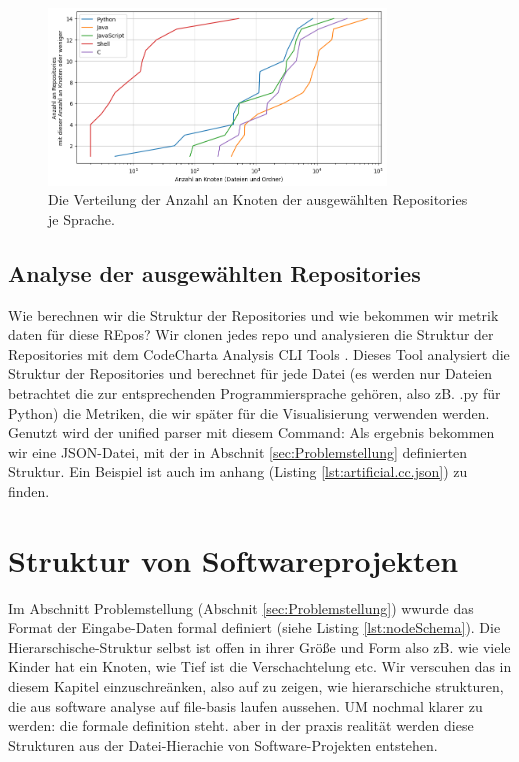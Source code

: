 \begin{figure}
    \centering
    \includegraphics[width=0.8\textwidth]{images/datenanalyse/repoAnzahlNodesVerteilung.png}
    \caption{Die Verteilung der Anzahl an Knoten der ausgewählten Repositories je Sprache.}
    \label{fig:repoAnzahlNodesVerteilung}
\end{figure}

\subsection{Analyse der ausgewählten Repositories} \label{sec:analyseDerAusgewähltenRepositories}
Wie berechnen wir die Struktur der Repositories und wie bekommen wir metrik daten für diese REpos?
Wir clonen jedes repo und analysieren die Struktur der Repositories mit dem CodeCharta Analysis CLI Tools \cite{code_charta_wiki_ana}. Dieses Tool analysiert die Struktur der Repositories und berechnet für jede Datei (es werden nur Dateien betrachtet die zur entsprechenden Programmiersprache gehören, also zB. .py für Python) die Metriken, die wir später für die Visualisierung verwenden werden. Genutzt wird der unified parser mit diesem Command:
Als ergebnis bekommen wir eine JSON-Datei, mit der in Abschnit \ref{sec:Problemstellung} definierten Struktur. Ein Beispiel ist auch im anhang (Listing \ref{lst:artificial.cc.json}) zu finden.

\section{Struktur von Softwareprojekten} \label{sec:strukturVonSoftwareprojekten}    

Im Abschnitt Problemstellung (Abschnit \ref{sec:Problemstellung}) wwurde das Format der Eingabe-Daten formal definiert (siehe Listing \ref{lst:nodeSchema}). Die Hierarschische-Struktur selbst ist offen in ihrer Größe und Form also zB. wie viele Kinder hat ein Knoten, wie Tief ist die Verschachtelung etc. Wir verscuhen das in diesem Kapitel einzuschreänken, also auf zu zeigen, wie hierarschiche strukturen, die aus software analyse auf file-basis laufen aussehen. UM nochmal klarer zu werden: die formale definition steht. aber in der praxis realität werden diese Strukturen aus der Datei-Hierachie von Software-Projekten entstehen. 

